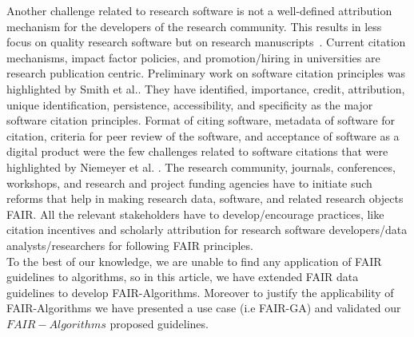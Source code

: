 \documentclass[preprint,12pt]{elsarticle}
\begin{document}
Another challenge related to research software is not a well-defined attribution mechanism for the developers of the research community. This results in less focus on quality research software but on research manuscripts~\cite{lamprecht2020towards}. Current citation mechanisms, impact factor policies, and promotion/hiring in universities are research publication centric. Preliminary work on software citation principles was highlighted by Smith et al.\cite{smith2016software}. They have identified, importance, credit, attribution, unique identification, persistence, accessibility, and specificity as the major software citation principles. Format of citing software, metadata of software for citation, criteria for peer review of the software, and acceptance of software as a digital product were the few challenges related to software citations that were highlighted by Niemeyer et al. \cite{niemeyer2016challenge}. The research community, journals, conferences, workshops, and research and project funding agencies have to initiate such reforms that help in making research data, software, and related research objects FAIR. All the relevant stakeholders have to develop/encourage practices, like citation incentives and scholarly attribution for research software developers/data analysts/researchers for following FAIR principles.\\
To the best of our knowledge, we are unable to find any application of FAIR guidelines to algorithms, so in this article, we have extended FAIR data guidelines to develop FAIR-Algorithms. Moreover to justify the applicability of FAIR-Algorithms we have presented a use case (i.e FAIR-GA) and validated our $FAIR-Algorithms$ proposed guidelines.  

\end{document}
